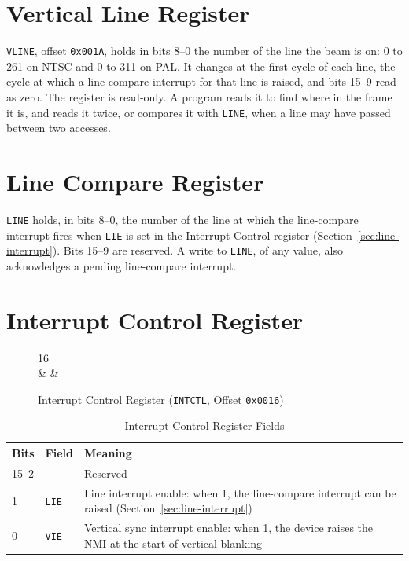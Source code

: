 \section{Vertical Line Register}
\label{sec:reg-vline}

\texttt{VLINE}, offset \texttt{0x001A}, holds in bits 8--0 the number of the line the beam is on: 0 to 261 on NTSC and 0 to 311 on
PAL. It changes at the first cycle of each line, the cycle at which a line-compare interrupt for that line is raised, and
bits 15--9 read as zero. The register is read-only. A program reads it to find where in the frame it is, and
reads it twice, or compares it with \texttt{LINE}, when a line may have passed between two accesses.

\section{Line Compare Register}
\label{sec:reg-line}

\texttt{LINE} holds, in bits 8--0, the number of the line at which the line-compare interrupt fires when \texttt{LIE} is set
in the Interrupt Control register (Section~\ref{sec:line-interrupt}). Bits 15--9 are reserved. A write to \texttt{LINE}, of
any value, also acknowledges a pending line-compare interrupt.

\section{Interrupt Control Register}
\label{sec:reg-intctl}

\begin{figure}[H]
	\centering
	\begin{bytefield}[bitwidth=2em]{16}
		 \\
		 &
		 &
	\end{bytefield}
	\caption{Interrupt Control Register (\texttt{INTCTL}, Offset \texttt{0x0016})}
	\label{fig:reg-intctl}
\end{figure}

\begin{table}[H]
	\centering
	\begin{tabular}{llp{7.5cm}}
		\toprule
		\textbf{Bits} & \textbf{Field} & \textbf{Meaning}                                                                                           \\
		\midrule
		15--2         & ---            & Reserved                                                                                                   \\
		1             & \texttt{LIE}   & Line interrupt enable: when 1, the line-compare interrupt can be raised (Section~\ref{sec:line-interrupt}) \\
		0             & \texttt{VIE}   & Vertical sync interrupt enable: when 1, the device raises the NMI at the start of vertical blanking        \\
		\bottomrule
	\end{tabular}
	\caption{Interrupt Control Register Fields}
	\label{tab:reg-intctl-fields}
\end{table}

